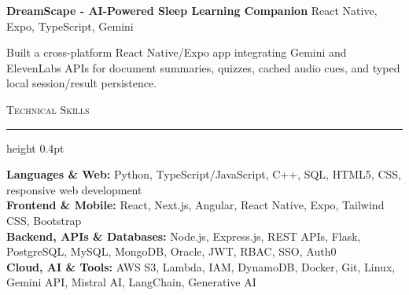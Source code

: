 \documentclass[letterpaper,11pt]{article}
\newcommand{\resumesection}[1]{%
  \par\vspace{2pt}%
  {\large\scshape #1}\par\vspace{2pt}%
  \hrule height 0.4pt\vspace{2pt}%
}
\newcommand{\projectHeading}[2]{
  \textbf{#1} \hfill #2
}
\begin{document}
\projectHeading{DreamScape - AI-Powered Sleep Learning Companion}{React Native, Expo, TypeScript, Gemini}
\begin{tightitemize}
  \item Built a cross-platform React Native/Expo app integrating Gemini and ElevenLabs APIs for document summaries, quizzes, cached audio cues, and typed local session/result persistence.
\end{tightitemize}

\resumesection{Technical Skills}
\textbf{Languages \& Web:} Python, TypeScript/JavaScript, C++, SQL, HTML5, CSS, responsive web development\\
\textbf{Frontend \& Mobile:} React, Next.js, Angular, React Native, Expo, Tailwind CSS, Bootstrap\\
\textbf{Backend, APIs \& Databases:} Node.js, Express.js, REST APIs, Flask, PostgreSQL, MySQL, MongoDB, Oracle, JWT, RBAC, SSO, Auth0\\
\textbf{Cloud, AI \& Tools:} AWS S3, Lambda, IAM, DynamoDB, Docker, Git, Linux, Gemini API, Mistral AI, LangChain, Generative AI
\end{document}
